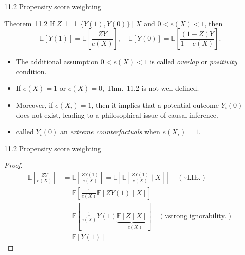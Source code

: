 \documentclass[aspectratio=169, 12pt]{beamer}
\newcommand{\indep}{\perp\!\!\!\perp}
\begin{document}
\begin{frame}{11.2 Propensity score weighting}
  \begin{keybox}{Theorem~11.2}
    If $Z\indep \{Y(1),Y(0)\}\mid X$ and $0<e(X)<1$, then 
    \[
    \mathbb{E}[Y(1)]=\mathbb{E}\left[\frac{ZY}{e(X)}\right],\quad \mathbb{E}[Y(0)] = \mathbb{E}\left[\frac{(1-Z)Y}{1-e(X)}\right].
    \]
  \end{keybox}
  \begin{itemize}
    \item The additional assumption $0<e(X)<1$ is called \textit{overlap} or \textit{positivity} condition.
    \item If $e(X)=1$ or $e(X)=0$, Thm.~11.2 is not well defined.
    \item Moreover, if $e(X_i)=1$, then it implies that a potential outcome $Y_i(0)$ does not exist, leading to a philosophical issue of causal inference.
    \item \citet{king2006dangers} called $Y_i(0)$ an \textit{extreme counterfactuals} when $e(X_i)=1$.
  \end{itemize}
\end{frame}

\begin{frame}{11.2 Propensity score weighting}
  
  \begin{proof}
    \begin{align*}
      \mathbb{E}\left[\frac{ZY}{e(X)}\right] 
      &= \mathbb{E}\left[\frac{ZY(1)}{e(X)}\right] = \mathbb{E}\left[\mathbb{E}\left[\frac{ZY(1)}{e(X)}\mid X\right]\right]\quad (\because \text{LIE.})\\
      &= \mathbb{E}\left[\frac{1}{e(X)}\mathbb{E}\left[ZY(1)\mid X\right]\right] \\
      &= \mathbb{E}\left[\frac{1}{e(X)}Y(1)\underbrace{\mathbb{E}[Z\mid X]}_{=e(X)}\right]\quad (\because \text{strong ignorability.})\\
      &= \mathbb{E}[Y(1)]
    \end{align*}
  \end{proof}
\end{frame}
\end{document}
